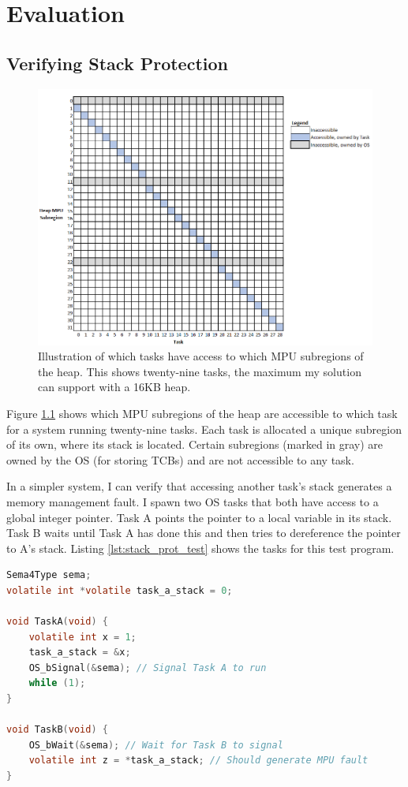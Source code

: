 
\chapter{Evaluation}

\section{Verifying Stack Protection}
\label{sec:stack_prot_eval}


\begin{figure}[h]
	\centering
	\includegraphics[width=\linewidth]{figs/task_access.png}
	\caption{Illustration of which tasks have access to which MPU subregions of the heap. This shows twenty-nine tasks, the maximum my solution can support with a 16KB heap.}
	\label{fig:task_access}
\end{figure}

Figure \ref{fig:task_access} shows which MPU subregions of the heap are accessible to which task for a system running twenty-nine tasks. Each task is allocated a unique subregion of its own, where its stack is located. Certain subregions (marked in gray) are owned by the OS (for storing TCBs) and are not accessible to any task.

In a simpler system, I can verify that accessing another task's stack generates a memory management fault. I spawn two OS tasks that both have access to a global integer pointer. Task A points the pointer to a local variable in its stack. Task B waits until Task A has done this and then tries to dereference the pointer to A's stack. Listing \ref{lst:stack_prot_test} shows the tasks for this test program.
\begin{lstlisting}[language=c, caption={Stack Protection Test Program}, captionpos=b, label={lst:stack_prot_test}, float]
Sema4Type sema;
volatile int *volatile task_a_stack = 0;

void TaskA(void) {
    volatile int x = 1;
    task_a_stack = &x;
    OS_bSignal(&sema); // Signal Task A to run
    while (1);
}

void TaskB(void) {
    OS_bWait(&sema); // Wait for Task B to signal
    volatile int z = *task_a_stack; // Should generate MPU fault
}
\end{lstlisting}

